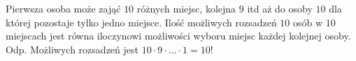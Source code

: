 \documentclass[a4paper,11pt]{article}
\begin{document}
\maketitle

Pierwsza osoba może zająć $10$ różnych miejsc, kolejna $9$ itd aż do osoby $10$ dla której pozostaje tylko jedno miejsce. Ilość możliwych rozsadzeń $10$ osób w $10$ miejscach jest równa iloczynowi możliwości wyboru miejsc każdej kolejnej osoby.
\\
Odp. Możliwych rozsadzeń jest $10 \cdot 9 \cdot . . . \cdot 1 = 10!$
\end{document}
